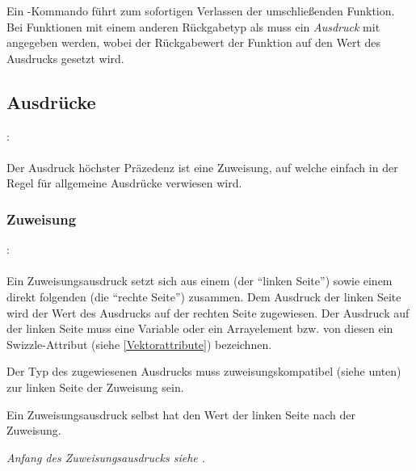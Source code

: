 Ein -Kommando führt zum sofortigen Verlassen der umschließenden Funktion.
Bei Funktionen mit einem anderen Rückgabetyp als  muss ein \emph{Ausdruck} mit angegeben
werden, wobei der Rückgabewert der Funktion auf den Wert des Ausdrucks gesetzt wird.

\subsection{Ausdrücke}\label{Ausdruecke}
:\label{ausdruck}\\
\hspace*{1cm} \Gspace{}\\

Der Ausdruck höchster Präzedenz ist eine Zuweisung, auf welche einfach in der Regel für
allgemeine Ausdrücke verwiesen wird.


\subsubsection{Zuweisung}\label{Zuweisung}
:\label{asdr_suffix_zuweisung}\\
\hspace*{1cm}\Gt{=}\Gspace{} \\

Ein Zuweisungsausdruck setzt sich aus einem  (der "`linken Seite"') sowie einem
direkt folgenden  (die "`rechte Seite"') zusammen.
Dem Ausdruck der linken Seite wird der Wert des Ausdrucks
auf der rechten Seite zugewiesen. Der Ausdruck auf der linken Seite muss eine Variable oder ein Arrayelement
bzw. von diesen ein Swizzle-Attribut (siehe \ref{Vektorattribute}) bezeichnen.

Der Typ des zugewiesenen Ausdrucks muss zuweisungskompatibel (siehe unten) zur linken Seite der Zuweisung sein.

Ein Zuweisungsausdruck selbst hat den Wert der linken Seite nach der Zuweisung.

\emph{Anfang des Zuweisungsausdrucks siehe .}

